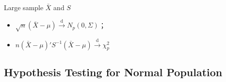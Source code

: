     

\begin{point}
    Large sample $ \bar{X} $ and $ S $
\end{point}
\begin{itemize}[topsep=2pt,itemsep=2pt]
    \item $ \sqrt{n}(\bar{X}-\mu)\xrightarrow[]{\mathrm{d}} N_p(0,\Sigma ) $；
    \item $ n(\bar{X}-\mu)'S ^{-1}(\bar{X}-\mu)\xrightarrow[]{\mathrm{d}} \chi_p^2 $
\end{itemize}

    




\subsection{Hypothesis Testing for Normal Population}\label{SubSectionMultivariateHypothesisTesting}
